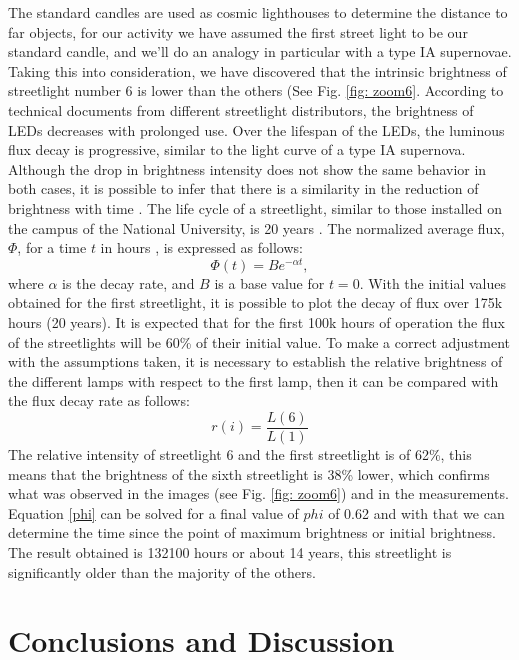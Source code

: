 \documentclass[aps,rmp,twocolumn,nofootinbib,superscriptaddress,floatfix,longbibliography]{revtex4-2}
\begin{document}
The standard candles are used as cosmic lighthouses to determine the distance to far objects, for our activity we have assumed the first street light to be our standard candle, and we'll do an analogy in particular with a type IA supernovae. Taking this into consideration, we have discovered that the intrinsic brightness of streetlight number 6 is lower than the others (See Fig. \ref{fig: zoom6}. According to technical documents from different streetlight distributors, the brightness of LEDs decreases with prolonged use. Over the lifespan of the LEDs, the luminous flux decay is progressive, similar to the light curve of a type IA supernova. Although the drop in brightness intensity does not show the same behavior in both cases, it is possible to infer that there is a similarity in the reduction of brightness with time
.
The life cycle of a streetlight, similar to those installed on the campus of the National University, is 20 years \cite{web_technic_streetligh}. The normalized average flux, \( \Phi \), for a time \( t \) in hours \cite{Curso_LED}, is expressed as follows:
\begin{equation}
    \Phi(t) = B e^{-\alpha t},
    \label{phi}
\end{equation}
where \(\alpha\) is the decay rate,  and \(B\) is a base value for \(t = 0\). With the initial values obtained for the first streetlight, it is possible to plot the decay of flux over 175k hours (20 years). It is expected that for the first 100k hours of operation the flux of the streetlights will be 60\% of their initial value.
To make a correct adjustment with the assumptions taken, it is necessary to establish the relative brightness of the different lamps with respect to the first lamp, then it can be compared with the flux decay rate as follows:
\begin{equation}
    r(i) = \frac{L(6)}{L(1)}
    \label{relative}
\end{equation}
The relative intensity of streetlight 6 and the first streetlight is of 62\%, this means that the brightness of the sixth streetlight is 38\% lower, which confirms what was observed in the images (see Fig. \ref{fig: zoom6}) and in the measurements. Equation \eqref{phi} can be solved for a final value of $phi$ of 0.62 and with that we can determine the time since the point of maximum brightness or initial brightness. The result obtained is 132100 hours or about 14 years, this streetlight is significantly older than the majority of the others.


\section{Conclusions and Discussion}
\end{document}
